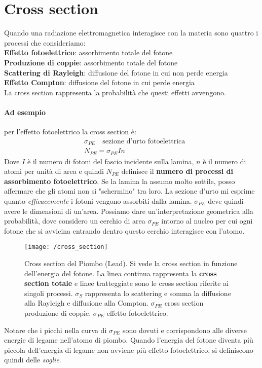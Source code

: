 

\section{Cross section}
Quando una radiazione elettromagnetica interagisce con la materia sono quattro i processi che consideriamo: \\
\textbf{Effetto fotoelettrico}: assorbimento totale del fotone \\
\textbf{Produzione di coppie}: assorbimento totale del fotone \\
\textbf{Scattering di Rayleigh}: diffusione del fotone in cui non perde energia \\
\textbf{Effetto Compton}: diffusione del fotone in cui perde energia \\
La cross section rappresenta la probabilità che questi effetti avvengono.

\paragraph{Ad esempio} per l'effetto fotoelettrico la cross section è:
\begin{equation}
\begin{split}
& \sigma_{PE} \quad \mbox{sezione d'urto fotoelettrica} \\
& N_{PE} = \sigma_{PE} I n
\end{split}
\end{equation}
Dove $I$ è il numero di fotoni del fascio incidente sulla lamina, $n$ è il numero di atomi per unità di area e quindi $N_{PE}$ definisce il \textbf{numero di processi di assorbimento fotoelettrico}.
Se la lamina la assumo molto sottile, posso affermare che gli atomi non si "schermino" tra loro.
La sezione d'urto mi esprime quanto \textit{efficacemente} i fotoni vengono assorbiti dalla lamina.
$\sigma_{PE}$ deve quindi avere le dimensioni di un'area.
Possiamo dare un'interpretazione geometrica alla probabilità, dove considero un cerchio di area $\sigma_{PE}$ intorno al nucleo per cui ogni fotone che si avvicina entrando dentro questo cerchio interagisce con l'atomo.
\begin{figure}[h]
\centering
\texttt{[image: /cross\_section]}
\caption{Cross section del Piombo (Lead). Si vede la cross section in funzione dell'energia del fotone. La linea continua rappresenta la \textbf{cross section totale} e linee tratteggiate sono le cross section riferite ai singoli processi. $\sigma_S$ rappresenta lo scattering e somma la diffusione alla Rayleigh e diffusione alla Compton. $\sigma_{PR}$ cross section produzione di coppie. $\sigma_{PE}$ effetto fotoelettrico.}
\end{figure}

Notare che i picchi nella curva di $\sigma_{PE}$ sono dovuti e corrispondono alle diverse energie di legame nell'atomo di piombo.
Quando l'energia del fotone diventa più piccola dell'energia di legame non avviene più effetto fotoelettrico, si definiscono quindi delle \textit{soglie}.






